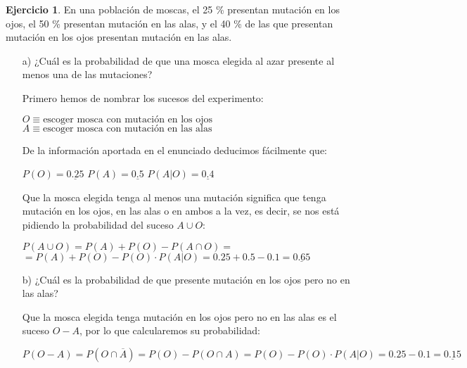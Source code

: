 \documentclass[a4paper, 12pt]{article}
\theoremstyle{definition}
\newtheorem{ej}{Ejercicio}
\begin{document}
\begin{ej}
En una población de moscas, el 25 \% presentan mutación en los ojos, el 50 \% presentan mutación
en las alas, y el 40 \% de las que presentan mutación en los ojos presentan mutación en las alas.

\begin{enumerate}


\item[a)] ¿Cuál es la probabilidad de que una mosca elegida al azar presente al menos una de las
mutaciones?

Primero hemos de nombrar los sucesos del experimento:

\begin{center}
    $O \equiv \text{escoger mosca con mutación en los ojos}$
    $A \equiv \text{escoger mosca con mutación en las alas}$
\end{center}

De la información aportada en el enunciado deducimos fácilmente que:

\begin{center}
    $P(O) = \underline{0.25}$ \hspace{1cm} $P(A) = \underline{0.5}$ \hspace{1cm} $P(A|O) = \underline{0.4}$
\end{center}

Que la mosca elegida tenga al menos una mutación  significa que tenga mutación en los ojos, en las alas o en ambos a la vez, es decir, se nos está pidiendo la probabilidad del suceso $A\cup O$:

\begin{center}
    $P(A\cup O) = P(A) + P(O) - P(A\cap O) =$
    $= P(A) + P(O) - P(O)\cdot P(A|O) = 0.25 + 0.5 - 0.1 = \underline{0.65}$
\end{center}

\item[b)] ¿Cuál es la probabilidad de que presente mutación en los ojos pero no en las alas?

Que la mosca elegida tenga mutación en los ojos pero no en las alas es el suceso $O-A$, por lo que calcularemos su probabilidad:

\begin{center}
    $P(O-A) = P(O\cap \overline{A}) = P(O) - P(O\cap A) = P(O) - P(O)\cdot P(A|O) = 0.25 - 0.1 = \underline{0.15}$
\end{center}
\end{enumerate}
\end{ej}
\end{document}
